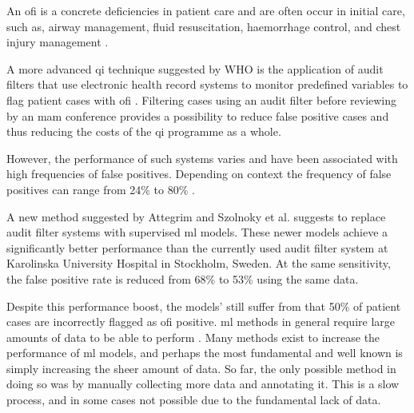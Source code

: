 \documentclass[12pt, letterpaper]{article}
\begin{document}
An \acrshort{ofi} is a concrete deficiencies in patient care and are often occur in initial care, such as, airway management, fluid resuscitation, haemorrhage control, and chest injury management \cite{world_health_organization_guidelines_2009,roy_learning_2017,oreilly_opportunities_2013,sanddal_analysis_2011}.

A more advanced \acrshort{qi} technique suggested by WHO is the application of audit filters that use electronic health record systems to monitor predefined variables to flag patient cases with \acrfull{ofi} \cite{world_health_organization_guidelines_2009}. Filtering cases using an audit filter before reviewing by an \acrshort{mam} conference provides a possibility to reduce false positive cases and thus reducing the costs of the \acrshort{qi} programme as a whole.

However, the performance of such systems varies and have been associated with high frequencies of false positives. Depending on context the frequency of false positives can range from 24\% to 80\% \cite{attergrim_predicting_2023,sanddal_analysis_2011,roy_learning_2017,ghorbani_analysis_2018}.

A new method suggested by Attegrim and Szolnoky et al. \cite{attergrim_predicting_2023} suggests to replace audit filter systems with supervised \acrfull{ml} models. These newer models achieve a significantly better performance than the currently used audit filter system at Karolinska University Hospital in Stockholm, Sweden. At the same sensitivity, the false positive rate is reduced from 68\% to 53\% using the same data.

Despite this performance boost, the models' still suffer from that 50\% of patient cases are incorrectly flagged as \acrshort{ofi} positive. \acrshort{ml} methods in general require large amounts of data to be able to perform \cite{piccialli_survey_2021}. Many methods exist to increase the performance of \acrshort{ml} models, and perhaps the most fundamental and well known is simply increasing the sheer amount of data. So far, the only possible method in doing so was by manually collecting more data and annotating it. This is a slow process, and in some cases not possible due to the fundamental lack of data.
\end{document}
